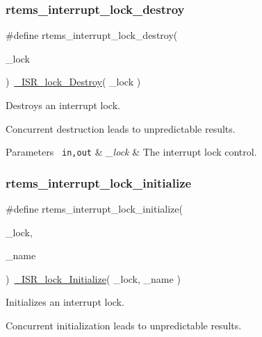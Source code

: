 \subsubsection{\texorpdfstring{rtems\_interrupt\_lock\_destroy}{rtems\_interrupt\_lock\_destroy}}
{\footnotesize\ttfamily \#define rtems\+\_\+interrupt\+\_\+lock\+\_\+destroy(\begin{DoxyParamCaption}\item[{}]{\+\_\+lock }\end{DoxyParamCaption})~\mbox{\hyperlink{group__RTEMSScoreISRLocks_ga918784c3c13a2fb3a27173cbc471285a}{\+\_\+\+I\+S\+R\+\_\+lock\+\_\+\+Destroy}}( \+\_\+lock )}



Destroys an interrupt lock. 

Concurrent destruction leads to unpredictable results.


\begin{DoxyParams}[1]{Parameters}
\mbox{\texttt{ in,out}}  & {\em \+\_\+lock} & The interrupt lock control. \\
\hline
\end{DoxyParams}
\mbox{\label{group__ClassicINTRLocks_gab8417ae3bed7e8164f7e2212ea9c40bb}} 
\subsubsection{\texorpdfstring{rtems\_interrupt\_lock\_initialize}{rtems\_interrupt\_lock\_initialize}}
{\footnotesize\ttfamily \#define rtems\+\_\+interrupt\+\_\+lock\+\_\+initialize(\begin{DoxyParamCaption}\item[{}]{\+\_\+lock,  }\item[{}]{\+\_\+name }\end{DoxyParamCaption})~\mbox{\hyperlink{group__RTEMSScoreISRLocks_gafeb5128bdf7cc2d29f9f51a85a7d0220}{\+\_\+\+I\+S\+R\+\_\+lock\+\_\+\+Initialize}}( \+\_\+lock, \+\_\+name )}



Initializes an interrupt lock. 

Concurrent initialization leads to unpredictable results.


